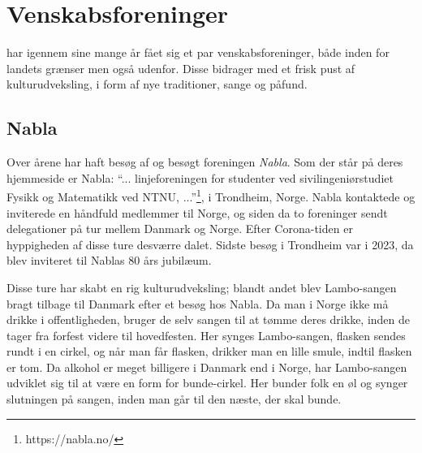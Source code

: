 \section{Venskabsforeninger}

\TKET har igennem sine mange år fået sig et par venskabsforeninger, både inden for landets grænser men også udenfor. Disse bidrager med et frisk pust af kulturudveksling, i form af nye traditioner, sange og påfund. 


\subsection{Nabla}
Over årene har \TKET haft besøg af og besøgt foreningen \textit{Nabla}. Som der står på deres hjemmeside er Nabla: ``... linjeforeningen for studenter ved sivilingeniørstudiet Fysikk og Matematikk ved NTNU, ...''\footnote{https://nabla.no/}, i Trondheim, Norge. Nabla kontaktede  og inviterede en håndfuld medlemmer til Norge, og siden da to foreninger sendt delegationer på tur mellem Danmark og Norge. Efter Corona-tiden er hyppigheden af disse ture desværre dalet. Sidste besøg i Trondheim var i 2023, da \TKET blev inviteret til Nablas 80 års jubilæum.

Disse ture har skabt en rig kulturudveksling; blandt andet blev Lambo-sangen bragt tilbage til Danmark efter et besøg hos Nabla. Da man i Norge ikke må drikke i offentligheden, bruger de selv sangen til at tømme deres drikke, inden de tager fra forfest videre til hovedfesten. Her synges Lambo-sangen, flasken sendes rundt i en cirkel, og når man får flasken, drikker man en lille smule, indtil flasken er tom. Da alkohol er meget billigere i Danmark end i Norge, har Lambo-sangen udviklet sig til at være en form for bunde-cirkel. Her bunder folk en øl og synger slutningen på sangen, inden man går til den næste, der skal bunde.

